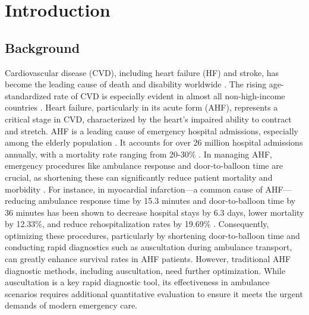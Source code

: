 \section{Introduction}\label{sec:introduction}
\subsection{Background}
Cardiovascular disease (CVD), including heart failure (HF) and stroke, has become the leading cause of death and disability worldwide \cite{virani2020heart,roth2020global,mensah2019global,boorsma2020congestion}. The rising age-standardized rate of CVD is especially evident in almost all non-high-income countries \cite{roth2020global}. Heart failure, particularly in its acute form (AHF), represents a critical stage in CVD, characterized by the heart's impaired ability to contract and stretch. AHF is a leading cause of emergency hospital admissions, especially among the elderly population \cite{sinnenberg2020acute,arrigo2020acute}. It accounts for over 26 million hospital admissions annually, with a mortality rate ranging from 20-30\% \cite{chapman2019clinical}. In managing AHF, emergency procedures like ambulance response and door-to-balloon time are crucial, as shortening these can significantly reduce patient mortality and morbidity \cite{victor2012door,fan2021effects}. For instance, in myocardial infarction—a common cause of AHF—reducing ambulance response time by 15.3 minutes and door-to-balloon time by 36 minutes has been shown to decrease hospital stays by 6.3 days, lower mortality by 12.33\%, and reduce rehospitalization rates by 19.69\% \cite{fan2021effects}. Consequently, optimizing these procedures, particularly by shortening door-to-balloon time and conducting rapid diagnostics such as auscultation during ambulance transport, can greatly enhance survival rates in AHF patients. However, traditional AHF diagnostic methods, including auscultation, need further optimization. While auscultation is a key rapid diagnostic tool, its effectiveness in ambulance scenarios requires additional quantitative evaluation to ensure it meets the urgent demands of modern emergency care.

